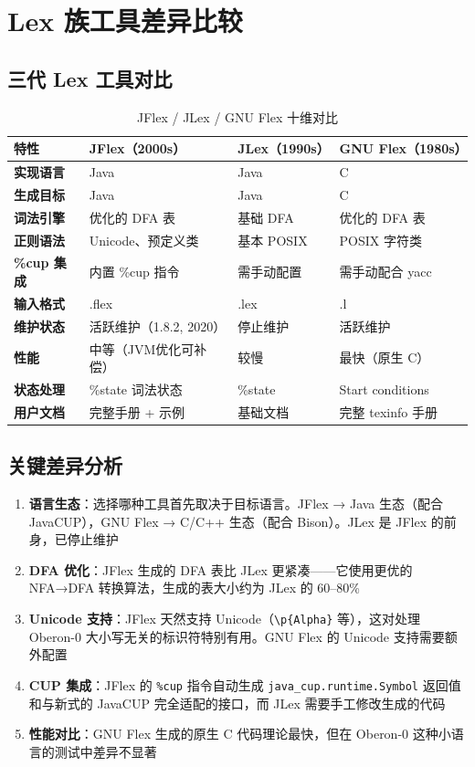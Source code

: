\documentclass[12pt,a4paper,fontset=none]{ctexart}
\begin{document}
\section{Lex 族工具差异比较}

\subsection{三代 Lex 工具对比}

\begin{table}[H]\centering
\footnotesize
\setlength{\tabcolsep}{3pt}
\begin{tabularx}{\textwidth}{>{\bfseries}P{2cm}>{\raggedright\arraybackslash}X>{\raggedright\arraybackslash}X>{\raggedright\arraybackslash}X}
\toprule
特性 & JFlex（2000s） & JLex（1990s） & GNU Flex（1980s） \\
\midrule
实现语言 & Java & Java & C \\
生成目标 & Java & Java & C \\
词法引擎 & 优化的 DFA 表 & 基础 DFA & 优化的 DFA 表 \\
正则语法 & Unicode、预定义类 & 基本 POSIX & POSIX 字符类 \\
\%cup 集成 & 内置 \%cup 指令 & 需手动配置 & 需手动配合 yacc \\
输入格式 & .flex & .lex & .l \\
维护状态 & 活跃维护（1.8.2, 2020） & 停止维护 & 活跃维护 \\
性能 & 中等（JVM优化可补偿） & 较慢 & 最快（原生 C） \\
状态处理 & \%state 词法状态 & \%state & Start conditions \\
用户文档 & 完整手册 + 示例 & 基础文档 & 完整 texinfo 手册 \\
\bottomrule
\end{tabularx}
\caption{JFlex / JLex / GNU Flex 十维对比}
\label{tab:lexcompare}
\end{table}

\subsection{关键差异分析}

\begin{enumerate}
  \item \textbf{语言生态}：选择哪种工具首先取决于目标语言。JFlex → Java 生态（配合 JavaCUP），GNU Flex → C/C++ 生态（配合 Bison）。JLex 是 JFlex 的前身，已停止维护
  \item \textbf{DFA 优化}：JFlex 生成的 DFA 表比 JLex 更紧凑——它使用更优的 NFA→DFA 转换算法，生成的表大小约为 JLex 的 60--80\%
  \item \textbf{Unicode 支持}：JFlex 天然支持 Unicode（\texttt{\textbackslash p\{Alpha\}} 等），这对处理 Oberon-0 大小写无关的标识符特别有用。GNU Flex 的 Unicode 支持需要额外配置
  \item \textbf{CUP 集成}：JFlex 的 \texttt{\%cup} 指令自动生成 \texttt{java\_cup.runtime.Symbol} 返回值和与新式的 JavaCUP 完全适配的接口，而 JLex 需要手工修改生成的代码
  \item \textbf{性能对比}：GNU Flex 生成的原生 C 代码理论最快，但在 Oberon-0 这种小语言的测试中差异不显著
\end{enumerate}
\end{document}
